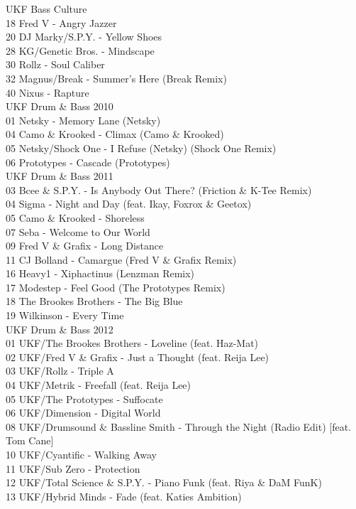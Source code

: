 \begin{multicols}{2}
 \large UKF Bass Culture \normalsize\\
 18 Fred V - Angry Jazzer\\ 20 DJ Marky/S.P.Y. - Yellow Shoes\\ 28 KG/Genetic Bros. - Mindscape\\ 30 Rollz - Soul Caliber\\ 32 Magnus/Break - Summer's Here (Break Remix)\\ 40 Nixus - Rapture\\
 \large UKF Drum \& Bass 2010 \normalsize\\
 01 Netsky - Memory Lane (Netsky)\\ 04 Camo \& Krooked - Climax (Camo \& Krooked)\\ 05 Netsky/Shock One - I Refuse (Netsky) (Shock One Remix)\\ 06 Prototypes - Cascade (Prototypes)\\
 \large UKF Drum \& Bass 2011 \normalsize\\
 03 Bcee \& S.P.Y. - Is Anybody Out There? (Friction \& K-Tee Remix)\\ 04 Sigma - Night and Day (feat. Ikay, Foxrox \& Geetox)\\ 05 Camo \& Krooked - Shoreless\\ 07 Seba - Welcome to Our World\\ 09 Fred V \& Grafix - Long Distance\\ 11 CJ Bolland - Camargue (Fred V \& Grafix Remix)\\ 16 Heavy1 - Xiphactinus (Lenzman Remix)\\ 17 Modestep - Feel Good (The Prototypes Remix)\\ 18 The Brookes Brothers - The Big Blue\\ 19 Wilkinson - Every Time\\
 \large UKF Drum \& Bass 2012 \normalsize\\
 01 UKF/The Brookes Brothers - Loveline (feat. Haz-Mat)\\ 02 UKF/Fred V \& Grafix - Just a Thought (feat. Reija Lee)\\ 03 UKF/Rollz - Triple A\\ 04 UKF/Metrik - Freefall (feat. Reija Lee)\\ 05 UKF/The Prototypes - Suffocate\\ 06 UKF/Dimension - Digital World\\ 08 UKF/Drumsound \& Bassline Smith - Through the Night (Radio Edit) [feat. Tom Cane]\\ 10 UKF/Cyantific - Walking Away\\ 11 UKF/Sub Zero - Protection\\ 12 UKF/Total Science \& S.P.Y. - Piano Funk (feat. Riya \& DaM FunK)\\ 13 UKF/Hybrid Minds - Fade (feat. Katies Ambition)\\

\end{multicols}
